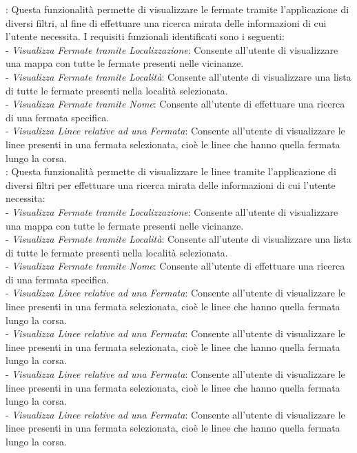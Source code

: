 : Questa funzionalit\`{a} permette di visualizzare le fermate tramite l’applicazione di diversi filtri, al fine di effettuare una ricerca mirata delle informazioni di cui l’utente necessita. I requisiti funzionali identificati sono i seguenti:\\

 - \emph{Visualizza Fermate tramite Localizzazione}: Consente all’utente di visualizzare una mappa con tutte le fermate presenti nelle vicinanze.\\
 - \emph{Visualizza Fermate tramite Localit\`{a}}: Consente all’utente di visualizzare una lista di tutte le fermate presenti nella località selezionata.\\
 - \emph{Visualizza Fermate tramite Nome}: Consente all’utente di effettuare una ricerca di una fermata specifica.\\
 - \emph{Visualizza Linee relative ad una Fermata}: Consente all’utente di visualizzare le linee presenti in una fermata selezionata, cioè le linee che hanno quella fermata lungo la corsa.\\

: Questa funzionalit\`{a} permette di visualizzare le linee tramite l’applicazione di diversi filtri per effettuare una ricerca mirata delle informazioni di cui l’utente necessita:\\

 - \emph{Visualizza Fermate tramite Localizzazione}: Consente all’utente di visualizzare una mappa con tutte le fermate presenti nelle vicinanze.\\
 - \emph{Visualizza Fermate tramite Localit\`{a}}: Consente all’utente di visualizzare una lista di tutte le fermate presenti nella località selezionata.\\
 - \emph{Visualizza Fermate tramite Nome}: Consente all’utente di effettuare una ricerca di una fermata specifica.\\
 - \emph{Visualizza Linee relative ad una Fermata}: Consente all’utente di visualizzare le linee presenti in una fermata selezionata, cioè le linee che hanno quella fermata lungo la corsa.\\
 - \emph{Visualizza Linee relative ad una Fermata}: Consente all’utente di visualizzare le linee presenti in una fermata selezionata, cioè le linee che hanno quella fermata lungo la corsa.\\
 - \emph{Visualizza Linee relative ad una Fermata}: Consente all’utente di visualizzare le linee presenti in una fermata selezionata, cioè le linee che hanno quella fermata lungo la corsa.\\
 - \emph{Visualizza Linee relative ad una Fermata}: Consente all’utente di visualizzare le linee presenti in una fermata selezionata, cioè le linee che hanno quella fermata lungo la corsa.\\


